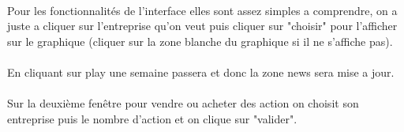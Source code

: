 \paragraph{} Pour les fonctionnalités de l'interface elles sont assez simples a comprendre, on a juste a cliquer sur l'entreprise qu'on veut puis cliquer sur "choisir" pour l'afficher sur le graphique (cliquer sur la zone blanche du graphique si il ne s'affiche pas).
\paragraph{} En cliquant sur play une semaine passera et donc la zone news sera mise a jour.
\paragraph{} Sur la deuxième fenêtre pour vendre ou acheter des action on choisit son entreprise puis le nombre d'action et on clique sur "valider".

